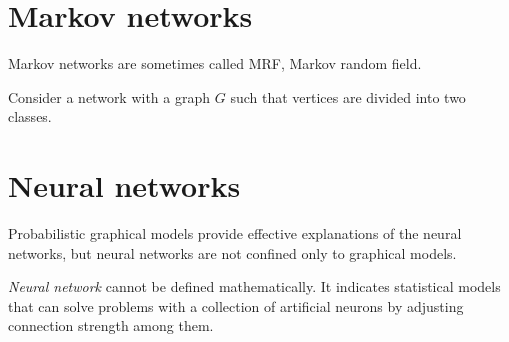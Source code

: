 \documentclass{../exp}
\begin{document}
\begin{ex}
\end{ex}
\begin{ex}
\end{ex}


\section{Markov networks}

\begin{defn}
\end{defn}
Markov networks are sometimes called MRF, Markov random field.

\begin{ex}
Consider a network with a graph $G$ such that vertices are divided into two classes.
\end{ex}

\section{Neural networks}
Probabilistic graphical models provide effective explanations of the neural networks, but neural networks are not confined only to graphical models.
\begin{defn}
\emph{Neural network} cannot be defined mathematically.
It indicates statistical models that can solve problems with a collection of artificial neurons by adjusting connection strength among them.
\end{defn}

\begin{ex}

\end{ex}

\begin{ex}

\end{ex}
\end{document}

